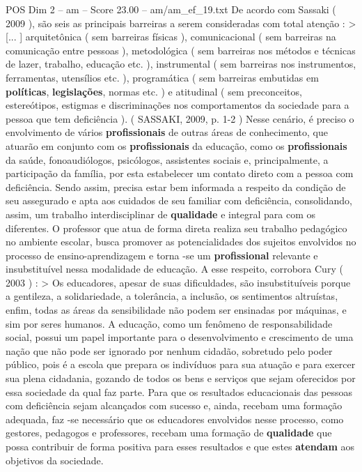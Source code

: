 \begin{textsample}{POS Dim 2 – am – Score 23.00 – am/am\_ef\_19.txt}
De acordo com Sassaki ( 2009 ), são seis as principais barreiras a serem consideradas com total atenção : > [... ] arquitetônica ( sem barreiras físicas ), comunicacional ( sem barreiras na comunicação entre pessoas ), metodológica ( sem barreiras nos métodos e técnicas de lazer, trabalho, educação etc. ), instrumental ( sem barreiras nos instrumentos, ferramentas, utensílios etc. ), programática ( sem barreiras embutidas em \textbf{políticas}, \textbf{legislações}, normas etc. ) e atitudinal ( sem preconceitos, estereótipos, estigmas e discriminações nos comportamentos da sociedade para a pessoa que tem deficiência ). ( SASSAKI, 2009, p. 1-2 ) Nesse cenário, é preciso o envolvimento de vários \textbf{profissionais} de outras áreas de conhecimento, que atuarão em conjunto com os \textbf{profissionais} da educação, como os \textbf{profissionais} da saúde, fonoaudiólogos, psicólogos, assistentes sociais e, principalmente, a participação da família, por esta estabelecer um contato direto com a pessoa com deficiência.
Sendo assim, precisa estar bem informada a respeito da condição de seu assegurado e apta aos cuidados de seu familiar com deficiência, consolidando, assim, um trabalho interdisciplinar de \textbf{qualidade} e integral para com os diferentes.
O professor que atua de forma direta realiza seu trabalho pedagógico no ambiente escolar, busca promover as potencialidades dos sujeitos envolvidos no processo de ensino-aprendizagem e torna -se um \textbf{profissional} relevante e insubstituível nessa modalidade de educação.
A esse respeito, corrobora Cury ( 2003 ) : > Os educadores, apesar de suas dificuldades, são insubstituíveis porque a gentileza, a solidariedade, a tolerância, a inclusão, os sentimentos altruístas, enfim, todas as áreas da sensibilidade não podem ser ensinadas por máquinas, e sim por seres humanos.
A educação, como um fenômeno de responsabilidade social, possui um papel importante para o desenvolvimento e crescimento de uma nação que não pode ser ignorado por nenhum cidadão, sobretudo pelo poder público, pois é a escola que prepara os indivíduos para sua atuação e para exercer sua plena cidadania, gozando de todos os bens e serviços que sejam oferecidos por essa sociedade da qual faz parte.
Para que os resultados educacionais das pessoas com deficiência sejam alcançados com sucesso e, ainda, recebam uma formação adequada, faz -se necessário que os educadores envolvidos nesse processo, como gestores, pedagogos e professores, recebam uma formação de \textbf{qualidade} que possa contribuir de forma positiva para esses resultados e que estes \textbf{atendam} aos objetivos da sociedade.

\end{textsample}
